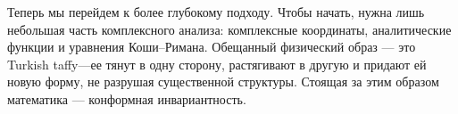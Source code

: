 Теперь мы перейдем к более глубокому подходу. Чтобы начать, нужна лишь небольшая часть комплексного анализа: комплексные координаты, аналитические функции и уравнения Коши--Римана.
Обещанный физический образ — это Turkish taffy---ее тянут в одну сторону, растягивают в другую и придают ей новую форму, не разрушая существенной структуры. Стоящая за этим образом математика — конформная инвариантность.